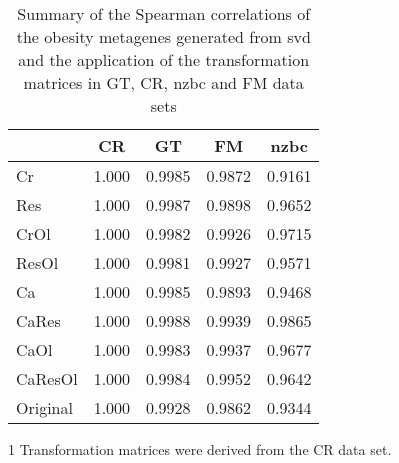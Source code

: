 \begin{table}[htpb]
	\centering
	\begin{threeparttable}
		\caption{Summary of the Spearman correlations of the obesity metagenes generated from \gls{svd} and the application of the transformation matrices in GT, CR, \gls{nzbc} and FM data sets}
		\label{tab:svd_vs_tm_obs}
		\begin{tabular}{lcccc}
			& CR & GT & FM & \gls{nzbc}\\
			\hline
			\hline
			\rule{0pt}{2.25ex} Cr & 1.000     & 0.9985 & 0.9872 & 0.9161 \\
			Res                   & 1.000     & 0.9987 & 0.9898 & 0.9652 \\
			CrOl                  & 1.000     & 0.9982 & 0.9926 & 0.9715 \\
			ResOl                 & 1.000     & 0.9981 & 0.9927 & 0.9571 \\
			Ca                    & 1.000     & 0.9985 & 0.9893 & 0.9468 \\
			CaRes                 & 1.000     & 0.9988 & 0.9939 & 0.9865 \\
			CaOl                  & 1.000     & 0.9983 & 0.9937 & 0.9677 \\
			CaResOl               & 1.000     & 0.9984 & 0.9952 & 0.9642 \\
			Original              & 1.000     & 0.9928 & 0.9862 & 0.9344 \\
			\hline
			\hline
		\end{tabular}
			\begin{tablenotes}
				\begin{footnotesize}
				\item [1] Transformation matrices were derived from the CR data set.
				\end{footnotesize}
			\end{tablenotes}
	\end{threeparttable}
\end{table}

